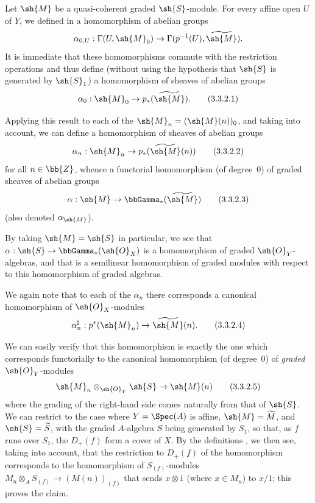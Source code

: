 \begin{env}[3.3.2]
\label{II.3.3.2}
Let $\sh{M}$ be a quasi-coherent graded $\sh{S}$-module.
For every affine open $U$ of $Y$, we defined in  a homomorphism of abelian groups
\[
  \alpha_{0,U} : \Gamma(U,\sh{M}_0) \to \Gamma(p^{-1}(U),\widetilde{\sh{M}}).
\]
It is immediate that these homomorphisms commute with the restriction operations  and thus define (without using the hypothesis that $\sh{S}$ is generated by $\sh{S}_1$) a homomorphism of sheaves of abelian groups
\[
\label{II.3.3.2.1}
  \alpha_0 : \sh{M}_0 \to p_*(\widetilde{\sh{M}}).
\tag{3.3.2.1}
\]

Applying this result to each of the $\sh{M}_n=(\sh{M}(n))_0$, and taking  into account, we can define a homomorphism of sheaves of abelian groups
\[
\label{II.3.3.2.2}
  \alpha_n : \sh{M}_n \to p_*(\widetilde{\sh{M}}(n))
\tag{3.3.2.2}
\]
for all $n\in\bb{Z}$, whence a functorial homomorphism (of degree~$0$) of graded sheaves of abelian groups
\[
\label{II.3.3.2.3}
  \alpha : \sh{M} \to \bbGamma_*(\widetilde{\sh{M}})
\tag{3.3.2.3}
\]
(also denoted $\alpha_{\sh{M}}$).

By taking $\sh{M}=\sh{S}$ in particular, we see that $\alpha:\sh{S}\to\bbGamma_*(\sh{O}_X)$ is a homomorphism of graded $\sh{O}_Y$-algebras, and that  is a semilinear homomorphism of graded modules with respect to this homomorphism of graded algebras.

We again note that to each of the $\alpha_n$ there corresponds  a canonical homomorphism of $\sh{O}_X$-modules
\[
\label{II.3.3.2.4}
  \alpha_n^\sharp : p^*(\sh{M}_n) \to \widetilde{\sh{M}}(n).
\tag{3.3.2.4}
\]

We can easily verify that this homomorphism is exactly the one which corresponds functorially  to the canonical homomorphism (of degree~$0$) of \emph{graded} $\sh{O}_Y$-modules
\[
\label{II.3.3.2.5}
  \sh{M}_n\otimes_{\sh{O}_Y}\sh{S} \to \sh{M}(n)
\tag{3.3.2.5}
\]
where the grading of the right-hand side comes naturally from that of $\sh{S}$.
We can restrict to the case where $Y=\Spec(A)$ is affine, $\sh{M}=\widetilde{M}$, and $\sh{S}=\widetilde{S}$, with the graded $A$-algebra $S$ being generated by $S_1$, so that, as $f$ runs over $S_1$, the $D_+(f)$ form a cover of $X$.
By the definitions , we then see, taking  into account, that the restriction to $D_+(f)$ of the homomorphism  corresponds  to the homomorphism of $S_{(f)}$-modules $M_n\otimes_A S_{(f)}\to(M(n))_{(f)}$ that sends $x\otimes1$ (where $x\in M_n$) to $x/1$;
this proves the claim.
\end{env}

